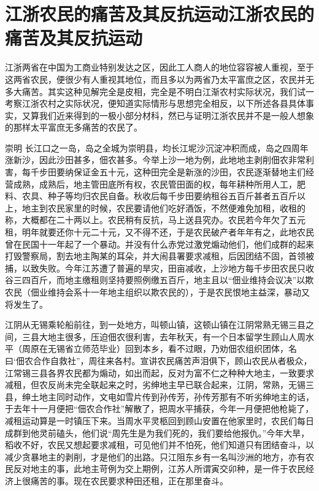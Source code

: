 \section[江浙农民的痛苦及其反抗运动江浙农民的痛苦及其反抗运动]{江浙农民的痛苦及其反抗运动江浙农民的痛苦及其反抗运动}


江浙两省在中国为工商业特别发达之区，因此工人商人的地位容容被人重视，至于这两省农民，便很少有人重视其地位，而且多以为两省乃太平富庶之区，农民并无多大痛苦。其实这种见解完全是皮相，完全是不明白江渐农村实际状况，我们试一考察江浙农村之实际状况，便知道实际情形与思想完全相反，以下所述各县具体事实，又算我们近来得到的一极小部分材科，然已与证明江浙农民并不是一般人想象的那样太平富庶无多痛苦的农民了。

崇明 长江口之一岛，岛之全城为崇明县，均长江坭沙沉淀冲积而成，岛之四周年涨新沙，因此沙田甚多，佃农甚多。今举上沙一地为例，此地地主剥削佃农非常利害，每千步田要纳保证金五十元，这种田完全是新涨的沙田，农民逐渐替地主们经营成熟，成熟后，地主管田底所有权，农民管田面的权，每年耕种所用人工，肥料、农具、种子等均归农民自备。秋收后每千步田要纳租谷五百斤甚者五百斤以上，地主到农民家里的时候，农民要请他们吃好酒饭，不然便难免加租，收租的称，大概都在二十两以上。农民稍有反抗，马上送县究办。农民若今年欠了五元租，明年就要还你十元二十元，又不得不还，于是农民破产者年年有之，此地农民曾在民国十一年起了一个暴动。并没有什么赤党过激党煽动他们，他们成群的起来打毁警察局，割去地主陶某的耳朵，并大闹县署要求减租，后因团结不固，首领被捕，以致失败。今年江苏遭了普遍的旱灾，田亩减收，上沙地方每千步田农民只收谷三四百斤，而地主缴租则坚持要照例缴五百斤，地主且以“佃业维持会议决”以欺农民（佃业维持会系十一年地主组织以欺农民的），于是农民恨地主益深，暴动又将发生了。

江阴从无锡乘轮船前往，到一处地方，叫顿山镇，这顿山镇在江阴常熟无锡三县之间，三县大地主很多，压迫佃农很利害，去年秋天，有一个日本留学生顾山人周水平（周原在无锡省立师范毕业）回到本乡，看不过眼，乃劝佃农组织团体，名曰‘佃农合作自救社”，周往来各村。宣讲农民痛苦声泪俱下，顾山农民从者极众，江常锡三县各界农民都为煽动，如出而起，反对为富不仁之种种大地主，一致要求减租，但农反尚未完全联起来之时，劣绅地主早已联合起来，江阴，常熟，无锡三县，绅土地主同时动作，文电如雪片传到孙传芳，孙传芳那有不听劣绅地主的话，于去年十一月便把“佃农合作社”解散了，把周水平捕获，今年一月便把他枪毙了，减租运动算是一时镇压下来。当周水平灵柩回到顾山安置在他家里时，农民们每日成群到他灵前磕头，他们说“周先生是为我们死的，我们要给他报仇。”今年大旱，稻收不好，农民又想起要求减租，可见他们并不怕死，他们知道只有团结奋斗，以减少贪暴地主的剥削，才是他们的出路。只江阻东乡有一名叫沙洲的地方，亦有农民反对地主的事，此地主苛例为交上期例，江苏人所谓寅交卯种，是一件于农民经济上很痛苦的事。现在农民要求种田还租，正在那里奋斗。

